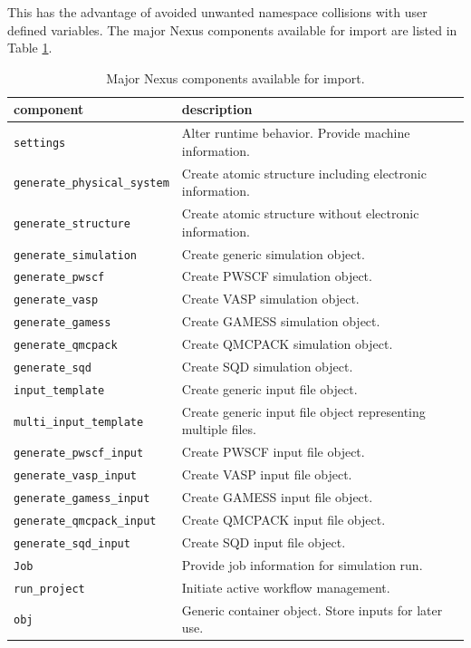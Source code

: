 \documentclass[oneside,11pt]{memoir}
\numberwithin{equation}{section}
\begin{document}
\noindent
This has the advantage of avoided unwanted namespace collisions with user defined variables.
The major Nexus components available for import are listed in Table \ref{tab:imports}.

\FloatBarrier
\begin{table}[h]
\begin{center}
\begin{tabularx}{\textwidth}{l l}
   \hline
   \bfseries component                 & \bfseries description \\
   \hline
   \texttt{settings}                   & Alter runtime behavior.  Provide machine information.    \\
   \texttt{generate\_physical\_system} & Create atomic structure including electronic information.  \\
   \texttt{generate\_structure}        & Create atomic structure without electronic information.    \\
   \texttt{generate\_simulation}       & Create generic simulation object.    \\
   \texttt{generate\_pwscf}            & Create PWSCF simulation object.    \\
   \texttt{generate\_vasp}             & Create VASP simulation object.    \\
   \texttt{generate\_gamess}           & Create GAMESS simulation object.    \\
   \texttt{generate\_qmcpack}          & Create QMCPACK simulation object.    \\
   \texttt{generate\_sqd}              & Create SQD simulation object.    \\
   \texttt{input\_template}            & Create generic input file object. \\
   \texttt{multi\_input\_template}     & Create generic input file object representing multiple files.\\
   \texttt{generate\_pwscf\_input}     & Create PWSCF input file object.    \\
   \texttt{generate\_vasp\_input}      & Create VASP input file object.    \\
   \texttt{generate\_gamess\_input}    & Create GAMESS input file object.    \\
   \texttt{generate\_qmcpack\_input}   & Create QMCPACK input file object.    \\
   \texttt{generate\_sqd\_input}       & Create SQD input file object.    \\
   \texttt{Job}                        & Provide job information for simulation run.    \\
   \texttt{run\_project}               & Initiate active workflow management.     \\
   \texttt{obj}                        & Generic container object.  Store inputs for later use.  \\
  \hline
\end{tabularx}
\end{center}
\caption{Major Nexus components available for import.\label{tab:imports}}
\end{table}
\FloatBarrier
\end{document}
